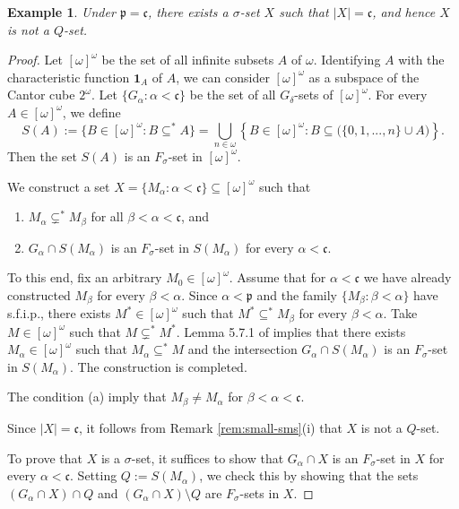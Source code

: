 \documentclass[preprint,11pt]{elsarticle}
\newtheorem{example}[theorem]{Example}
\numberwithin{equation}{section}
\numberwithin{theorem}{section}
\newcommand{\w}{\omega}
\def\al{\alpha}
\def\be{\beta}
\begin{document}
\begin{example}\label{exa:Q-neq-sigma}
Under $\mathfrak{p}=\mathfrak{c}$, there exists a $\sigma$-set $X$ such that $|X|=\mathfrak{c}$, and hence $X$ is not a $Q$-set.
\end{example}
\begin{proof}
Let $[\w]^\w$ be the set of all infinite subsets $A$ of $\w$. Identifying $A$ with the characteristic function $\mathbf{1}_A$ of $A$, we can consider $[\w]^\w$ as a subspace of the Cantor cube $2^\w$. Let $\{G_\alpha: \alpha< \mathfrak{c}\}$ be the set of all $G_\delta$-sets of $[\w]^\w$.
For every $A\in [\w]^\w$, we define
\[
S(A):=\{B\in [\w]^\w: B\subseteq^\ast A\}
=\bigcup_{n\in\w} \left\{ B\in [\w]^\w: B\subseteq \big(\{0,1,...,n\}\cup A\big)\right\}.
\]
Then the set $S(A)$ is an $F_\sigma$-set in $[\w]^\w$.



We construct a set $X=\{M_\alpha:\alpha<\mathfrak{c}\}\subseteq [\w]^\w$ such that
\begin{enumerate}
\item[(a)] $M_\alpha \subsetneq^\ast M_\beta$  for all $\beta< \alpha<\mathfrak{c}$, and
\item[(b)] $G_\alpha \cap S(M_\alpha)$ is an $F_\sigma$-set in $S(M_\alpha)$   for every $\alpha<\mathfrak{c}$.
\end{enumerate}
To this end, fix an arbitrary $M_0\in [\w]^\w$. Assume that for $\alpha<\mathfrak{c}$ we have already constructed $M_\beta$ for every $\beta<\alpha$. Since $\alpha<\mathfrak{p}$ and the family $\{M_\beta:\beta<\alpha\}$ have s.f.i.p., there exists  $M^\ast\in [\w]^\w$ such that $M^\ast \subseteq^\ast M_\beta$ for every $\beta<\alpha$.
Take $M\in [\w]^\w$ such that $M\subsetneq^\ast M^\ast$.
Lemma 5.7.1 of \cite{Miller} implies that there exists $M_\alpha\in [\w]^\w$ such that $M_\alpha \subseteq^\ast M$ and the intersection $G_\alpha \cap S(M_\alpha)$ is an $F_\sigma$-set in $S(M_\alpha)$.
The construction is completed.

The condition (a) imply that $M_\beta \neq M_\alpha$ for $\be<\al<\mathfrak{c}$.
\smallskip


Since $|X|=\mathfrak{c}$, it follows from Remark \ref{rem:small-sms}(i) that $X$ is not a $Q$-set.
\smallskip

To prove that $X$ is a $\sigma$-set, it suffices to show that $G_\alpha\cap X$ is an $F_\sigma$-set in $X$ for every $\alpha<\mathfrak{c}$. Setting $Q:=S(M_\alpha)$, we check this by showing that the sets $(G_\alpha\cap X) \cap Q$ and $(G_\alpha\cap X)\setminus Q$ are $F_\sigma$-sets in $X$.
\smallskip


\end{proof}
\end{document}
